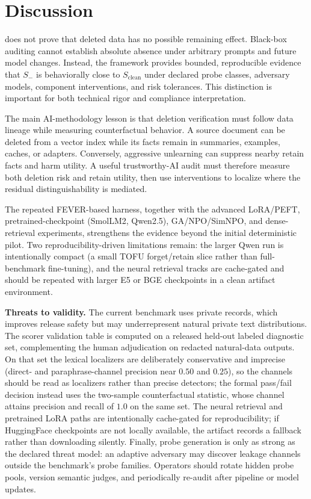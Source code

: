 \section{Discussion}

\method{} does not prove that deleted data has no possible remaining effect. Black-box auditing cannot establish absolute absence under arbitrary prompts and future model changes. Instead, the framework provides bounded, reproducible evidence that $S_-$ is behaviorally close to $S_{\mathrm{clean}}$ under declared probe classes, adversary models, component interventions, and risk tolerances. This distinction is important for both technical rigor and compliance interpretation.

The main AI-methodology lesson is that deletion verification must follow data lineage while measuring counterfactual behavior. A source document can be deleted from a vector index while its facts remain in summaries, examples, caches, or adapters. Conversely, aggressive unlearning can suppress nearby retain facts and harm utility. A useful trustworthy-AI audit must therefore measure both deletion risk and retain utility, then use interventions to localize where the residual distinguishability is mediated.

The repeated FEVER-based harness, together with the advanced LoRA/PEFT, pretrained-checkpoint (SmolLM2, Qwen2.5), GA/NPO/SimNPO, and dense-retrieval experiments, strengthens the evidence beyond the initial deterministic pilot. Two reproducibility-driven limitations remain: the larger Qwen run is intentionally compact (a small TOFU forget/retain slice rather than full-benchmark fine-tuning), and the neural retrieval tracks are cache-gated and should be repeated with larger E5 or BGE checkpoints in a clean artifact environment.

\textbf{Threats to validity.}
The current benchmark uses private records, which improves release safety but may underrepresent natural private text distributions. The scorer validation table is computed on a released held-out labeled diagnostic set, complementing the human adjudication on redacted natural-data outputs. On that set the lexical localizers are deliberately conservative and imprecise (direct- and paraphrase-channel precision near $0.50$ and $0.25$), so the channels should be read as localizers rather than precise detectors; the formal pass/fail decision instead uses the two-sample counterfactual statistic, whose channel attains precision and recall of $1.0$ on the same set. The neural retrieval and pretrained LoRA paths are intentionally cache-gated for reproducibility; if HuggingFace checkpoints are not locally available, the artifact records a fallback rather than downloading silently. Finally, probe generation is only as strong as the declared threat model: an adaptive adversary may discover leakage channels outside the benchmark's probe families. Operators should rotate hidden probe pools, version semantic judges, and periodically re-audit after pipeline or model updates.

